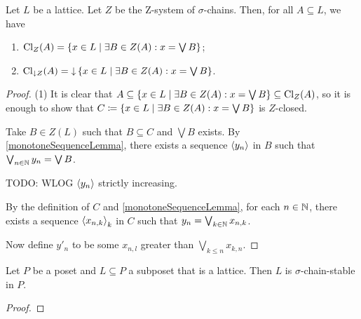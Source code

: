 \begin{proposition}
Let $L$ be a lattice. Let $Z$ be the $\mathrm{Z}$-system of $\sigma$-chains. Then, for all $A\subseteq L$, we have
\begin{enumerate}
\item $\Closure_{Z}(A) = \setbuilder{x\in L}{\exists B\in Z(A): x = \bigvee B}$;
\item $\Closure_{\downarrow Z}(A) = \downset\setbuilder{x\in L}{\exists B\in Z(A): x = \bigvee B}$.
\end{enumerate}
\end{proposition}
\begin{proof}
(1) It is clear that $A\subseteq \setbuilder{x\in L}{\exists B\in Z(A): x = \bigvee B} \subseteq \Closure_{Z}(A)$, so it is enough to show that $C\defeq \setbuilder{x\in L}{\exists B\in Z(A): x = \bigvee B}$ is $Z$-closed.

Take $B\in Z(L)$ such that $B\subseteq C$ and $\bigvee B$ exists. By \ref{monotoneSequenceLemma}, there exists a sequence $\left\langle y_n \right\rangle$ in $B$ such that $\bigvee_{n\in \mathbb{N}}y_n = \bigvee B$.

TODO: WLOG $\left\langle y_n \right\rangle$ strictly increasing.

By the definition of $C$ and \ref{monotoneSequenceLemma}, for each $n\in \mathbb{N}$, there exists a sequence $\left\langle x_{n,k} \right\rangle_k$ in $C$ such that $y_n = \bigvee_{k\in \mathbb{N}}x_{n,k}$.

Now define $y'_n$ to be some $x_{n, l}$ greater than $\bigvee_{k\leq n} x_{k,n}$.
\end{proof}

\begin{proposition}
Let $P$ be a poset and $L \subseteq P$ a subposet that is a lattice. Then $L$ is $\sigma$-chain-stable in $P$.
\end{proposition}
\begin{proof}

\end{proof}

